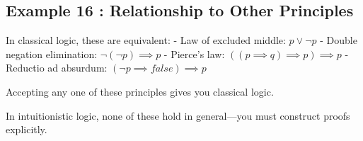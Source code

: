 \documentclass[a4paper,10pt,fleqn]{article}
\begin{document}
\bigskip

\subsection*{Example 16 : Relationship to Other Principles}

\noindent In classical logic, these are equivalent: - Law of excluded middle: $p \lor \lnot p$ - Double negation elimination: $\lnot (\lnot p) \implies p$ - Pierce's law: $((p \implies q) \implies p) \implies p$ - Reductio ad absurdum: $(\lnot p \implies false) \implies p$

\bigskip

\noindent Accepting any one of these principles gives you classical logic.

\bigskip

\noindent In intuitionistic logic, none of these hold in general—you must construct proofs explicitly.

\bigskip
\end{document}
